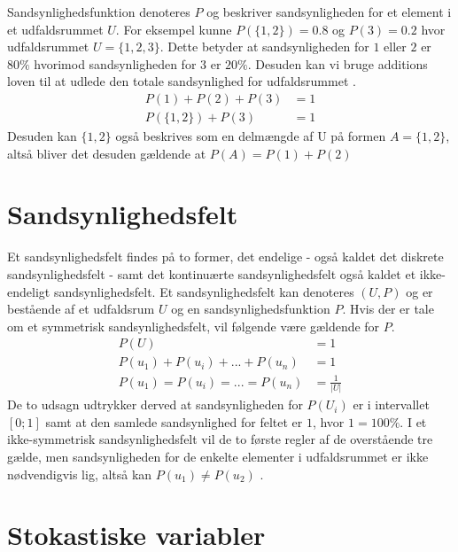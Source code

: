 \documentclass[../../SRP.tex]{subfiles}
\begin{document}
Sandsynlighedsfunktion denoteres $P$ og beskriver sandsynligheden for et element i et udfaldsrummet $U$. For eksempel kunne $P(\{1,2\}) = 0.8$ og $P(3) = 0.2$ hvor udfaldsrummet $U = \{1,2,3\}$. Dette betyder at sandsynligheden for $1$ eller $2$ er $80\%$ hvorimod sandsynligheden for $3$ er $20\%$. Desuden kan vi bruge additions loven til at udlede den totale sandsynlighed for udfaldsrummet \cite{SC}.
\begin{align}
  P(1) + P(2) + P(3) &= 1 \\
  P(\{1,2\}) + P(3) &= 1
\end{align}
Desuden kan $\{1,2\}$ også beskrives som en delmængde af U på formen $A = \{1,2\}$, altså bliver det desuden gældende at $P(A) = P(1) + P(2)$

\section{Sandsynlighedsfelt}

Et sandsynlighedsfelt findes på to former, det endelige - også kaldet det diskrete sandsynlighedsfelt - samt det kontinuærte sandsynlighedsfelt også kaldet et ikke-endeligt sandsynlighedsfelt. Et sandsynlighedsfelt kan denoteres $(U, P)$ og er bestående af et udfaldsrum $U$ og en sandsynlighedsfunktion $P$. Hvis der er tale om et symmetrisk sandsynlighedsfelt, vil følgende være gældende for $P$.
\begin{align}
  P(U) &= 1 \\
  P(u_1) + P(u_i) + ... + P(u_n) &= 1 \\
  P(u_1) = P(u_i) = ... = P(u_n) &= \frac{1}{|U|}
\end{align}
De to udsagn udtrykker derved at sandsynligheden for $P(U_i)$ er i intervallet $[0;1]$ samt at den samlede sandsynlighed for feltet er $1$, hvor $1 = 100\%$. I et ikke-symmetrisk sandsynlighedsfelt vil de to første regler af de overstående tre gælde, men sandsynligheden for de enkelte elementer i udfaldsrummet er ikke nødvendigvis lig, altså kan $P(u_1) \neq P(u_2)$ \cite{SC}.\\

\section{Stokastiske variabler}
\end{document}
